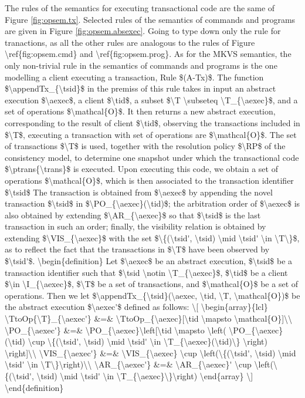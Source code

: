 The rules of the semantics for executing transactional code are the same of Figure \ref{fig:opsem.tx}.
Selected rules of the semantics of commands and programs are given in Figure \ref{fig:opsem.absexec}. 
\ac{Going to type down only the rule for tranactions, as all the other rules are analogous 
to the rules of Figure \ref{fig:opsem.cmd} and \ref{fig:opsem.prog}.

As for the MKVS semantics,  the only non-trivial rule in the semantics of commands and programs 
is the one modelling a client executing a transaction, Rule $(A-Tx)$.
The function $\appendTx_{\tsid}$ in the premiss of this rule takes in input an abstract execution 
$\aexec$, a client $\tid$, a subset $\T \subseteq \T_{\aexec}$, and a set of operations $\mathcal{O}$. 
It then returns a new abstract execution, corresponding to the result of client $\tid$, observing the
transactions included in $\T$, executing a transaction with set of operations 
are $\mathcal{O}$. The set of transactions $\T$ is used, together with the resolution policy 
$\RP$ of the consistency model, to determine one snapshot under which the transactional 
code $\ptrans{\trans}$ is executed. Upon executing this code, we obtain a set of operations 
$\mathcal{O}$, which is then associated to the transaction identifier $\tsid$
The transaction is obtained from $\aexec$ by appending the novel transaction $\tsid$
in $\PO_{\aexec}(\tid)$; the arbitration order of $\aexec$ is also obtained by extending 
$\AR_{\aexec}$ so that $\tsid$ is the last transaction in such an order; finally, the visibility 
relation is obtained by extending $\VIS_{\aexec}$ with the set $\{(\tsid', \tsid) \mid \tsid' \in \T\}$, 
as to reflect the fact that the transactions in $\T$ have been observed by $\tsid'$. 
\begin{definition}
Let $\aexec$ be an abstract execution, $\tsid$ be a transaction identifier such 
that $\tsid \notin \T_{\aexec}$,  $\tid$ be a client $\in \I_{\aexec}$, $\T$ be a set of transactions, 
and $\mathcal{O}$ be a set of operations. Then we let 
$\appendTx_{\tsid}(\aexec, \tid, \T, \mathcal{O})$ be the abstract execution $\aexec'$ defined as 
follows: 
\[
\begin{array}{lcl}
\TtoOp{\T}_{\aexec'} &=& \TtoOp_{\aexec}[\tid \mapsto \mathcal{O}]\\
\PO_{\aexec'} &=& \PO_{\aexec}\left[\tid \mapsto \left( \PO_{\aexec}(\tid) \cup \{(\tsid', \tsid) \mid \tsid' \in \T_{\aexec}(\tid)\} \right) \right]\\
\VIS_{\aexec'} &=& \VIS_{\aexec} \cup \left(\{(\tsid', \tsid) \mid \tsid' \in \T\}\right)\\
\AR_{\aexec'} &=& \AR_{\aexec}' \cup \left(\{(\tsid', \tsid) \mid \tsid' \in \T_{\aexec}\}\right)
\end{array}
\]
\end{definition}

}
